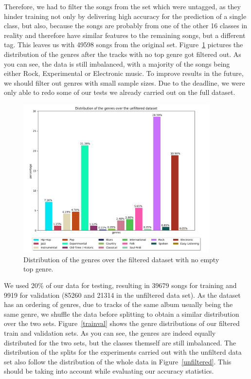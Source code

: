 Therefore, we had to filter the songs from the set which were untagged,
as they hinder training not only by delivering high accuracy for the
prediction of a single class, but also, because the songs are probably
from one of the other 16 classes in reality and therefore have similar
features to the remaining songs, but a different tag. This leaves us
with 49598 songs from the original set. Figure~\ref{filtered} pictures
the distribution of the genres after the tracks with no top genre got
filtered out. As you can see, the data is still imbalanced, with a
majority of the songs being either Rock, Experimental or Electronic
music. To improve results in the future, we should filter out genres
with small sample sizes. Due to the deadline, we were only able to redo
some of our tests we already carried out on the full dataset.\\
\begin{figure}
	\centering
	\includegraphics[width=0.9\textwidth]{images/genredistfiltered.png}
	\caption{Distribution of the genres over the filtered dataset with no empty
	top genre.}	
	\label{filtered}
\end{figure}
We used 20\% of our data for testing, resulting in 39679 songs for
training and 9919 for validation (85260 and 21314 in the unfiltered data
set). As the dataset has an ordering of genres, due to tracks of the
same album usually being the same genre, we shuffle the data before
splitting to obtain a similar distribution over the two sets.
Figure~\ref{trainval} shows the genre distributions of our filtered
train and validation sets. As you can see, the genres are indeed equally
distributed for the two sets, but the classes themself are still
imbalanced. The distribution of the splits for the experiments carried
out with the unfilterd data set also follow the distribution of the
whole data in Figure~\ref{unfiltered}. This should be taking into
account while evaluating our accuracy statistics.

